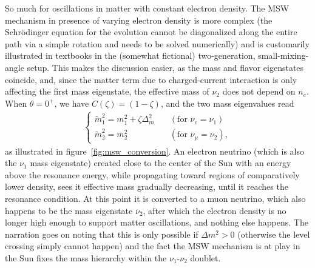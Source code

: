 \begin{marginfigure}
  
  \caption{Plot of the MSW resonance energy in the Sun, as a function of the distance
  from the center. Overlaid is the pdf for the Boron neutrino production.}
  \label{fig:msw_resonance_energy}
\end{marginfigure}

So much for oscillations in matter with constant electron density. The MSW mechanism
in presence of varying electron density is more complex (the Schrödinger equation
for the evolution cannot be diagonalized along the entire path via a simple rotation
and needs to be solved numerically) and is customarily illustrated in textbooks in
the (somewhat fictional) two-generation, small-mixing-angle setup. This makes the discussion
easier, as the mass and flavor eigenstates coincide, and, since the matter term due
to charged-current interaction is only affecting the first mass eigenstate, the
effective mass of $\nu_2$ does not depend on $n_e$. When $\theta = 0^+$, we have
$C(\zeta) = (1 - \zeta)$, and the two mass eigenvalues read
\begin{align*}
  \begin{cases}
  \tilde{m}_1^2 = m_1^2 + \zeta \Delta_m^2 & \quad (\text{for } \nu_e = \nu_1)\\
  \tilde{m}_2^2 = m_2^2 & \quad (\text{for } \nu_\mu = \nu_2),
\end{cases}
\end{align*}
as illustrated in figure~\ref{fig:msw_conversion}. An electron neutrino (which is also
the $\nu_1$ mass eigenstate) created close to the center of the Sun with an energy
above the resonance energy, while propagating toward regions of comparatively lower
density, sees it effective mass gradually decreasing, until it reaches the resonance
condition. At this point it is converted to a muon neutrino, which also happens to
be the mass eigenstate $\nu_2$, after which the electron density is no longer high
enough to support matter oscillations, and nothing else happens. The narration goes on
noting that this is only possible if $\Delta m^2 > 0$ (otherwise the level crossing
simply cannot happen) and the fact the MSW mechanism is at play in the Sun fixes
the mass hierarchy within the $\nu_1$-$\nu_2$ doublet.

\begin{marginfigure}
  
  \caption{Sketch of the MSW resonant conversion in the illustrative case of no
  vacuum mixing (i.e., when mass and flavor eigenstates coincide). Note that
  this phenomenon only takes place if $m_1 < m_2$, otherwise the two lines do not
  cross.}
  \label{fig:msw_conversion}
\end{marginfigure}

